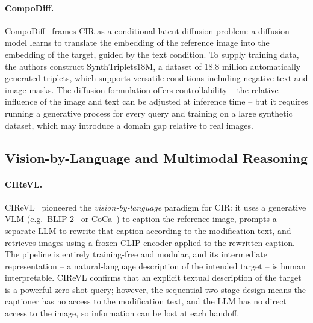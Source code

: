 \paragraph{CompoDiff.}
CompoDiff~\cite{gu2024compodiff} frames CIR as a conditional latent-diffusion
problem: a diffusion model learns to translate the embedding of the reference
image into the embedding of the target, guided by the text condition. To supply
training data, the authors construct SynthTriplets18M, a dataset of 18.8
million automatically generated triplets, which supports versatile conditions
including negative text and image masks. The diffusion formulation offers
controllability -- the relative influence of the image and text can be adjusted
at inference time -- but it requires running a generative process for every
query and training on a large synthetic dataset, which may introduce a domain
gap relative to real images.

\subsection{Vision-by-Language and Multimodal Reasoning}\label{sect:rel_caption}

\paragraph{CIReVL.}
CIReVL~\cite{karthik2024cirevl} pioneered the \emph{vision-by-language}
paradigm for CIR: it uses a generative VLM (e.g.\ BLIP-2~\cite{li2023blip2} or
CoCa~\cite{yu2022coca}) to caption
the reference image, prompts a separate LLM to rewrite that caption according to
the modification text, and retrieves images using a frozen CLIP encoder applied
to the rewritten caption. The pipeline is entirely training-free and modular, and
its intermediate representation -- a natural-language description of the intended
target -- is human interpretable. CIReVL confirms that an explicit textual
description of the target is a powerful zero-shot query; however, the sequential
two-stage design means the captioner has no access to the modification text, and
the LLM has no direct access to the image, so information can be lost at each
handoff.

